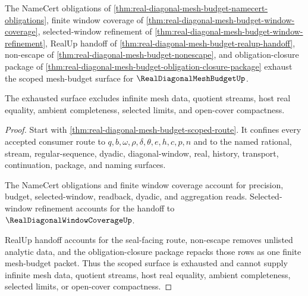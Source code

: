 \begin{theorem}
\label{thm:real-diagonal-mesh-budget-consumer-scope-exhaustion}
The NameCert obligations of \autoref{thm:real-diagonal-mesh-budget-namecert-obligations}, finite window coverage of \autoref{thm:real-diagonal-mesh-budget-window-coverage}, selected-window refinement of \autoref{thm:real-diagonal-mesh-budget-window-refinement}, RealUp handoff of \autoref{thm:real-diagonal-mesh-budget-realup-handoff}, non-escape of \autoref{thm:real-diagonal-mesh-budget-nonescape}, and obligation-closure package of \autoref{thm:real-diagonal-mesh-budget-obligation-closure-package} exhaust the scoped mesh-budget surface for $\RealDiagonalMeshBudgetUp$.

The exhausted surface excludes infinite mesh data, quotient streams, host real equality, ambient completeness, selected limits, and open-cover compactness.
\end{theorem}
\begin{proof}
Start with \autoref{thm:real-diagonal-mesh-budget-scoped-route}. It confines every accepted consumer route to $q,b,\omega,\rho,\delta,\theta,e,h,c,p,n$ and to the named rational, stream, regular-sequence, dyadic, diagonal-window, real, history, transport, continuation, package, and naming surfaces.

The NameCert obligations and finite window coverage account for precision, budget, selected-window, readback, dyadic, and aggregation reads. Selected-window refinement accounts for the handoff to $\RealDiagonalWindowCoverageUp$.

RealUp handoff accounts for the seal-facing route, non-escape removes unlisted analytic data, and the obligation-closure package repacks those rows as one finite mesh-budget packet. Thus the scoped surface is exhausted and cannot supply infinite mesh data, quotient streams, host real equality, ambient completeness, selected limits, or open-cover compactness.
\end{proof}

